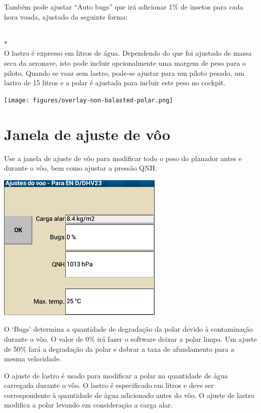 Também pode ajustar “Auto bugs” que irá adicionar 1\% de insetos para cada hora voada, ajustado da seguinte forma:

\blink{}\blink{}
\\*
\blink{}\blink{}\\

O lastro é expresso em litros de água.  Dependendo do que foi ajustado de massa seca da aeronave, isto pode incluir opcionalmente uma margem de peso para o piloto.  Quando se voar sem lastro, pode-se ajustar para um piloto pesado, um lastro de 15 litros e a polar é ajustada para incluir este peso no cockpit.

\begin{center}
\texttt{[image: figures/overlay-non-balasted-polar.png]}
\end{center}


\section{Janela de ajuste de vôo}\label{sec:flight-setup}
Use a janela de ajuste de vôo para modificar todo o peso do planador antes e durante o vôo, bem como ajustar a pressão QNH.

\begin{center}
\includegraphics[angle=0,width=0.45\linewidth,keepaspectratio='true']{figures/dialog-basicsettings.png}
\end{center}

O ‘Bugs’ determina a quantidade de degradação da polar devido à contaminação durante o vôo.  O valor de 0\% irá fazer o software deixar a polar limpa.  Um ajuste de 50\% fará a degradação da polar e dobrar a taxa de afundamento para a mesma velocidade.

O ajuste de lastro é usado para modificar a polar na quantidade de água carregada durante o vôo.  O lastro é especificado em litros e deve ser correspondente à quantidade de água adicionado antes do vôo.  O ajuste de lastro modifica a polar levando em consideração a carga alar.

